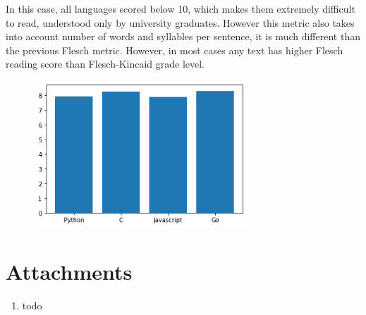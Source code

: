 \documentclass[]{article}
\begin{document}
In this case, all languages scored below 10, which makes them extremely difficult to read, understood only by university graduates. However this metric also takes into account number of words and syllables per sentence, it is much different than the previous Flesch metric. However, in most cases any text has higher Flesch reading score than Flesch-Kincaid grade level.

\begin{figure}[H]
    \includegraphics[width=8cm]{flesh_kincaid.png}
    \centering
\end{figure}

\section{Attachments} \label{attachments}

\begin{enumerate}
    \item todo
\end{enumerate}
\end{document}
